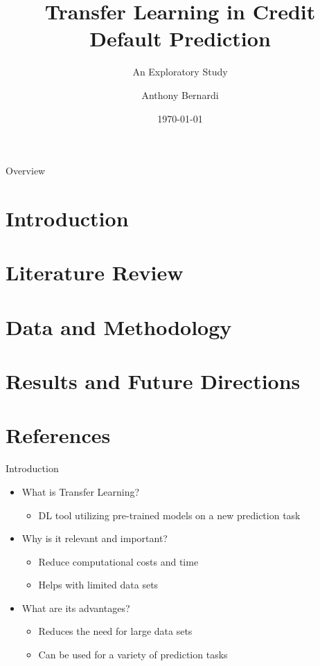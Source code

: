 \documentclass{beamer}
\title{Transfer Learning in Credit Default Prediction}
\subtitle{An Exploratory Study}
\author{Anthony Bernardi\inst{1}}
\institute{\inst{1} University of Kentucky - Department of Statistics}
\date{\today}
\begin{document}
\begin{frame}
   \titlepage 
\end{frame}

\begin{frame}{Overview} 
  \tableofcontents
\end{frame} 

\section{Introduction}
\section{Literature Review}
\section{Data and Methodology}
\section{Results and Future Directions}
\section*{References}

\begin{frame}{Introduction}
  
  \begin{itemize}
    \item What is Transfer Learning?
      \begin{itemize}
        \item DL tool utilizing pre-trained models on a new prediction task 
      \end{itemize}
    \item Why is it relevant and important?
      \begin{itemize}
        \item Reduce computational costs and time 
        \item Helps with limited data sets 
      \end{itemize}
    \item What are its advantages?
      \begin{itemize}
        \item Reduces the need for large data sets 
        \item Can be used for a variety of prediction tasks 
      \end{itemize} 
  \end{itemize}

\end{frame}
\end{document}
